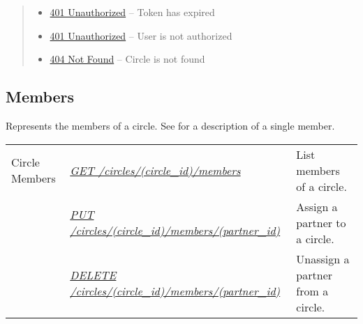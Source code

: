 \documentclass[letterpaper,10pt,english]{sphinxmanual}
\begin{document}
\begin{fulllineitems}
\begin{quote}
\begin{description}
\begin{itemize}
\item {} 
\href{http://www.w3.org/Protocols/rfc2616/rfc2616-sec10.html\#sec10.4.2}{401 Unauthorized} -- Token has expired

\item {} 
\href{http://www.w3.org/Protocols/rfc2616/rfc2616-sec10.html\#sec10.4.2}{401 Unauthorized} -- User is not authorized

\item {} 
\href{http://www.w3.org/Protocols/rfc2616/rfc2616-sec10.html\#sec10.4.5}{404 Not Found} -- Circle is not found

\end{itemize}

\end{description}\end{quote}

\end{fulllineitems}



\subsection{Members}
\label{\detokenize{resources/circle:members}}
Represents the members of a circle. See {\hyperref[\detokenize{resources/partner:partner}]{}} for a description of a single member.

\noindent\begin{tabulary}{\linewidth}{|L|L|L|}
\hline
{}\relax &\relax &\relax \\
\hline
Circle Members
&
{\hyperref[\detokenize{resources/circle:get--circles-(circle_id)-members}]{\emph{GET /circles/(circle\_id)/members}}}
&
List members of a circle.
\\
\hline&
{\hyperref[\detokenize{resources/circle:put--circles-(circle_id)-members-(partner_id)}]{\emph{PUT /circles/(circle\_id)/members/(partner\_id)}}}
&
Assign a partner to a circle.
\\
\hline&
{\hyperref[\detokenize{resources/circle:delete--circles-(circle_id)-members-(partner_id)}]{\emph{DELETE /circles/(circle\_id)/members/(partner\_id)}}}
&
Unassign a partner from a circle.
\\
\hline\end{tabulary}


\begin{DUlineblock}{0em}
\item[] 
\end{DUlineblock}
\end{document}
